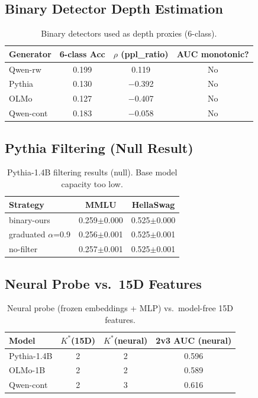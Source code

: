 \documentclass[11pt,a4paper]{article}
\begin{document}
\subsection{Binary Detector Depth Estimation}

\begin{table}[h]
\centering
\small
\caption{Binary detectors used as depth proxies (6-class).}
\label{tab:binary_baseline}
\begin{tabular}{lccc}
\toprule
Generator & 6-class Acc & $\rho$ (ppl\_ratio) & AUC monotonic? \\
\midrule
Qwen-rw  & 0.199 & 0.119  & No \\
Pythia   & 0.130 & $-$0.392 & No \\
OLMo     & 0.127 & $-$0.407 & No \\
Qwen-cont & 0.183 & $-$0.058 & No \\
\bottomrule
\end{tabular}
\end{table}

\subsection{Pythia Filtering (Null Result)}

\begin{table}[h]
\centering
\small
\caption{Pythia-1.4B filtering results (null). Base model capacity too low.}
\label{tab:pythia_filter}
\begin{tabular}{lcc}
\toprule
Strategy & MMLU & HellaSwag \\
\midrule
binary-ours      & 0.259$\pm$0.000 & 0.525$\pm$0.000 \\
graduated $\alpha$=0.9 & 0.256$\pm$0.001 & 0.525$\pm$0.001 \\
no-filter        & 0.257$\pm$0.001 & 0.525$\pm$0.001 \\
\bottomrule
\end{tabular}
\end{table}

\subsection{Neural Probe vs.\ 15D Features}

\begin{table}[h]
\centering
\small
\caption{Neural probe (frozen embeddings + MLP) vs.\ model-free 15D features.}
\label{tab:neural}
\begin{tabular}{lccc}
\toprule
Model & $K^*$(15D) & $K^*$(neural) & 2v3 AUC (neural) \\
\midrule
Pythia-1.4B & 2 & 2 & 0.596 \\
OLMo-1B    & 2 & 2 & 0.589 \\
Qwen-cont  & 2 & 3 & 0.616 \\
\bottomrule
\end{tabular}
\end{table}
\end{document}
